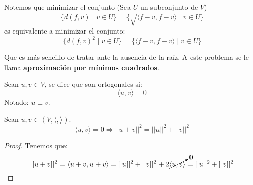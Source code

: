 \noindent
Notemos que minimizar el conjunto (Sea $U$ un subconjunto de $V$)
$$\{d(f,v) \mid v \in U\} = \{\sqrt{\langle f-v, f-v \rangle} \mid v \in U\}$$
es equivalente a minimizar el conjunto:
$$\{d(f,v)^2 \mid v \in U\} = \{\langle f-v, f-v \rangle \mid v \in U\}$$

\noindent
Que es más sencillo de tratar ante la ausencia de la raíz. A este problema se le llama \textbf{aproximación por mínimos cuadrados}.

\begin{definicion}[Ortogonalidad]
    Sean $u,v \in V$, se dice que son ortogonales si:
    $$\langle u,v \rangle = 0$$
    Notado: $u \perp v$.
\end{definicion}

\begin{prop}
    Sean $u,v\in (V,\langle,\rangle)$.
    \begin{equation*}
        \langle u,v\rangle = 0 \Longrightarrow ||u+v||^2 = ||u||^2 + ||v||^2
    \end{equation*}
\end{prop}
\begin{proof}
    Tenemos que:
    \begin{equation*}
        ||u+v||^2 = \langle u+v,u+v \rangle = ||u||^2 + ||v||^2 +2\cancelto{0}{\langle u,v\rangle} = ||u||^2 + ||v||^2
    \end{equation*}
\end{proof}

